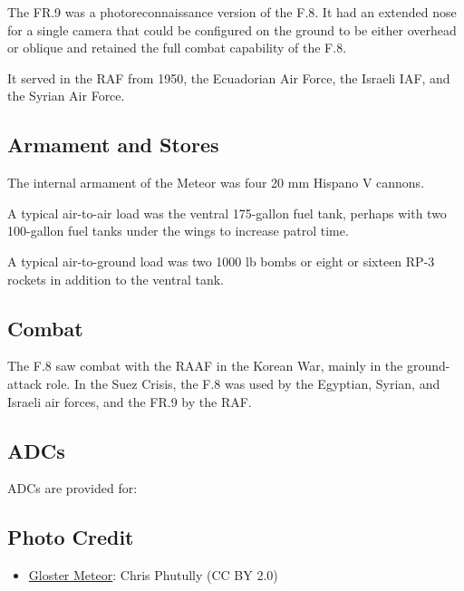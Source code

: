 The FR.9 was a photoreconnaissance version of the F.8. It had an extended nose for a single camera that could be configured on the ground to be either overhead or oblique and retained the full combat capability of the F.8.

It served in the RAF from 1950, the Ecuadorian Air Force, the Israeli IAF, and the Syrian Air Force.


\subsection{Armament and Stores}

The internal armament of the Meteor was four 20 mm Hispano V cannons.

A typical air-to-air load was the ventral 175-gallon fuel tank, perhaps with two 100-gallon fuel tanks under the wings to increase patrol time.

A typical air-to-ground load was two 1000 lb bombs or eight or sixteen RP-3 rockets in addition to the ventral tank.

\subsection{Combat}

The F.8 saw combat with the RAAF in the Korean War, mainly in the ground-attack role. In the Suez Crisis, the F.8 was used by the Egyptian, Syrian, and Israeli air forces, and the FR.9 by the RAF.

\subsection{ADCs}

ADCs are provided for:
\begin{adclist}
\end{adclist}

\subsection{Photo Credit}
\begin{itemize}\raggedright
    \item \href{https://commons.wikimedia.org/wiki/File:Gloster_Meteor_Centenary_of_Military_Aviation_2014_(cropped).jpg}{Gloster Meteor}: Chris Phutully (CC BY 2.0)
\end{itemize}
